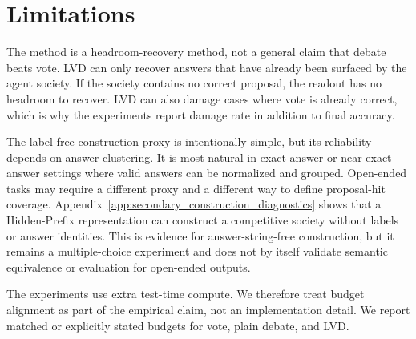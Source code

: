 \documentclass{article}
\begin{document}
\section{Limitations}\label{appsec:limitation}
The method is a headroom-recovery method, not a general claim that debate beats
vote. LVD can only recover answers that have already been surfaced by the agent
society. If the society contains no correct proposal, the readout has no
headroom to recover. LVD can also damage cases where vote is already correct,
which is why the experiments report damage rate in addition to final accuracy.

The label-free construction proxy is intentionally simple, but its reliability
depends on answer clustering. It is most natural in exact-answer or
near-exact-answer settings where valid answers can be normalized and grouped.
Open-ended tasks may require a different proxy and a different way to define
proposal-hit coverage. Appendix~\ref{app:secondary_construction_diagnostics}
shows that a Hidden-Prefix representation can construct a competitive society
without labels or answer identities. This is evidence for answer-string-free
construction, but it remains a multiple-choice experiment and does not by
itself validate semantic equivalence or evaluation for open-ended outputs.

The experiments use extra test-time compute. We therefore treat budget alignment
as part of the empirical claim, not an implementation detail. We report matched
or explicitly stated budgets for vote, plain debate, and LVD.
\end{document}

